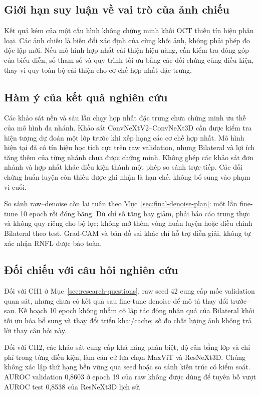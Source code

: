 \documentclass[14pt,a4paper,oneside]{extreport}
\begin{document}
\subsection{Giới hạn suy luận về vai trò của ảnh chiếu}
Kết quả kém của một cấu hình không chứng minh khối OCT thiếu tín hiệu
phân loại. Các ảnh chiếu là biến đổi xác định của cùng khối ảnh, không
phải phép đo độc lập mới. Nếu mô hình hợp nhất cải thiện hiệu năng,
cần kiểm tra đóng góp của biểu diễn, số tham số và quy trình tối ưu
bằng các đối chứng cùng điều kiện, thay vì quy toàn bộ cải thiện cho cơ chế hợp nhất đặc trưng.

\subsection{Hàm ý của kết quả nghiên cứu}
Các khảo sát nền và sáu lần chạy hợp nhất đặc trưng chưa chứng minh ưu thế của mô
hình đa nhánh. Khảo sát ConvNeXtV2--ConvNeXt3D cần được kiểm tra
hiện tượng dự đoán một lớp trước khi xếp hạng các cơ chế hợp nhất.
Mô hình hiện tại đã có tín hiệu học tích cực trên raw validation,
nhưng Bilateral và lợi ích tăng thêm của từng nhánh chưa được chứng minh.
Không ghép các khảo sát đơn nhánh và hợp nhất khác điều kiện thành một
phép so sánh trực tiếp. Các đối chứng huấn luyện còn thiếu được ghi
nhận là hạn chế, không bổ sung vào phạm vi cuối.

So sánh raw--denoise còn lại tuân theo Mục~\ref{sec:final-denoise-plan}:
một lần fine-tune 10 epoch rồi đóng băng. Dù chỉ số tăng hay giảm,
phải báo cáo trung thực và không quy riêng cho bộ lọc; không mở thêm
vòng huấn luyện hoặc điều chỉnh Bilateral theo test. Grad-CAM và
bản đồ sai khác chỉ hỗ trợ diễn giải, không tự xác nhận RNFL được bảo toàn.

\subsection{Đối chiếu với câu hỏi nghiên cứu}
Đối với CH1 ở Mục~\ref{sec:research-questions}, raw seed 42 cung cấp
mốc validation quan sát, nhưng chưa có kết quả sau fine-tune denoise
để mô tả thay đổi trước--sau. Kế hoạch 10 epoch không nhằm cô lập
tác động nhân quả của Bilateral khỏi tối ưu hóa bổ sung và thay đổi
triển khai/cache; số đo chất lượng ảnh không trả lời thay câu hỏi này.

Đối với CH2, các khảo sát cung cấp khả năng phân biệt, độ cân bằng
lớp và chi phí trong từng điều kiện, làm căn cứ lựa chọn MaxViT và
ResNeXt3D. Chúng không xác lập thứ hạng bền vững qua seed hoặc so sánh
kiến trúc có kiểm soát. AUROC validation 0,8603 ở epoch 19 của raw
không được dùng để tuyên bố vượt AUROC test 0,8538 của ResNeXt3D lịch sử.
\end{document}
